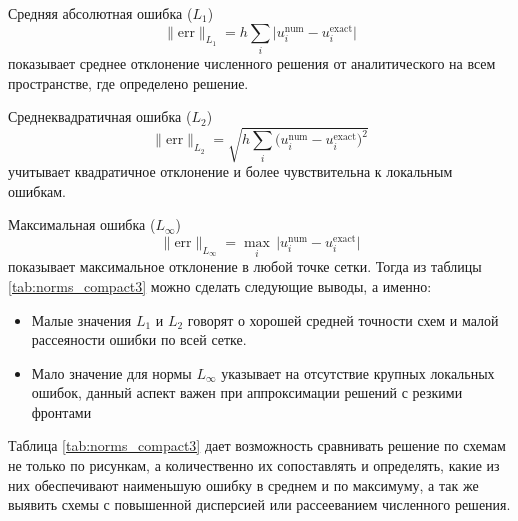 \documentclass[a4paper,14pt]{extreport}
\begin{document}
Средняя абсолютная ошибка ($L_1$)
\begin{equation}
	\| \text{err} \|_{L_1} = h\sum_{i} \big| u_i^{\text{num}} - u_i^{\text{exact}} \big|
\end{equation} 
показывает среднее отклонение численного решения от аналитического на всем пространстве, где определено решение. 

Среднеквадратичная ошибка ($L_2$)
\begin{equation}
		\| \text{err} \|_{L_2} = \sqrt{h\sum_{i} \big( u_i^{\text{num}} - u_i^{\text{exact}} \big)^2}
\end{equation}
учитывает квадратичное отклонение и более чувствительна к локальным ошибкам.

Максимальная ошибка ($L_\infty$) 
\begin{equation}
		\| \text{err} \|_{L_\infty} = \max_i \, \big| u_i^{\text{num}} - u_i^{\text{exact}} \big|
\end{equation}
показывает максимальное отклонение в любой точке сетки.
Тогда из таблицы \ref{tab:norms_compact3} можно сделать следующие выводы, а именно:
\begin{itemize}
	\item Малые значения $L_1$ и $L_2$ говорят о хорошей средней точности схем и малой рассеяности ошибки по всей сетке.
	\item Мало значение для нормы $L_\infty$ указывает на отсутствие крупных локальных ошибок, данный аспект важен при аппроксимации решений с резкими фронтами
\end{itemize}

Таблица \ref{tab:norms_compact3} дает возможность сравнивать решение по схемам не только по рисункам, а количественно их сопоставлять и определять, какие из них обеспечивают наименьшую ошибку в среднем и по максимуму, а так же выявить схемы с повышенной дисперсией или рассееванием численного решения.
\end{document}
